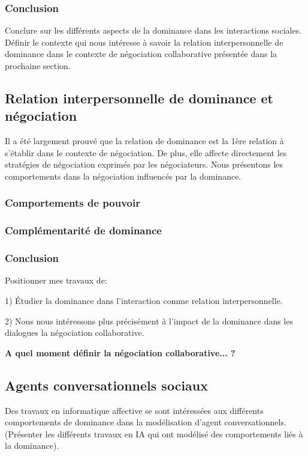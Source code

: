 \documentclass [french]{article}
\begin{document}
			\subsubsection{Conclusion} 
				Conclure sur les différents aspects de la dominance dans les interactions sociales.
				Définir le contexte qui nous intéresse à savoir la relation interpersonnelle de dominance dans le contexte de négociation collaborative présentée dans la prochaine section. 
		\subsection{Relation interpersonnelle de dominance et négociation}
			Il a été largement prouvé que la relation de dominance est la 1ère relation à s'établir dans le contexte de négociation. De  plus, elle  affecte directement les stratégies de négociation exprimés par les négociateurs. Nous présentons les comportements dans la négociation influencés par la dominance.
			
			\subsubsection{Comportements de pouvoir}
			
			\subsubsection{Complémentarité de dominance} 
				
			\subsubsection{Conclusion} Positionner mes travaux de:
			
			 1) Étudier la dominance dans l'interaction comme relation interpersonnelle. 
			
			2) Nous nous intéressons plus précisément à l'impact de la dominance dans les dialogues la négociation collaborative.
				 
				 \textbf{A quel moment définir la négociation collaborative... ?} 
				
				
		\subsection{Agents conversationnels sociaux}
			Des travaux en informatique affective se sont intéressées aux différents comportements de dominance dans la modélisation d'agent conversationnels.
			(Présenter les différents travaux en IA qui ont modélisé des comportements liés à la dominance).
			
\end{document}
